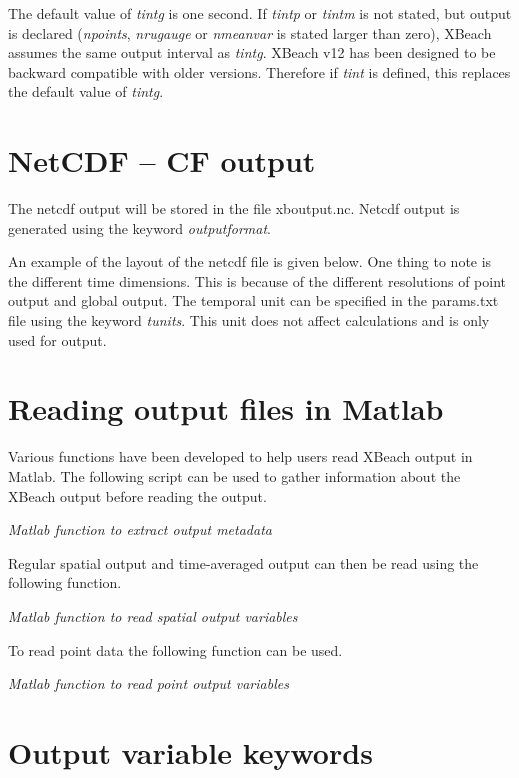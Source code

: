 The default value of \textit{tintg} is one second. If \textit{tintp} or \textit{tintm} is not stated, but output is declared (\textit{npoints}, \textit{nrugauge} or \textit{nmeanvar} is stated larger than zero), XBeach assumes the same output interval as \textit{tintg}. XBeach v12 has been designed to be backward compatible with older versions. Therefore if \textit{tint} is defined, this replaces the default value of \textit{tintg}. 


\section{NetCDF -- CF output }

The netcdf output will be stored in the file xboutput.nc. Netcdf output is generated using the keyword \textit{outputformat}. 

An example of the layout of the netcdf file is given below. One thing to note is the different time dimensions. This is because of the different resolutions of point output and global output. The temporal unit can be specified in the params.txt file using the keyword \textit{tunits}. This unit does not affect calculations and is only used for output. 




\section{Reading output files in Matlab}

Various functions have been developed to help users read XBeach output in Matlab. The following script can be used to gather information about the XBeach output before reading the output.

\textit{Matlab function to extract output metadata}

Regular spatial output and time-averaged output can then be read using the following function.

\textit{Matlab function to read spatial output variables}

To read point data the following function can be used.

\textit{Matlab function to read point output variables}








\section{Output variable keywords}

